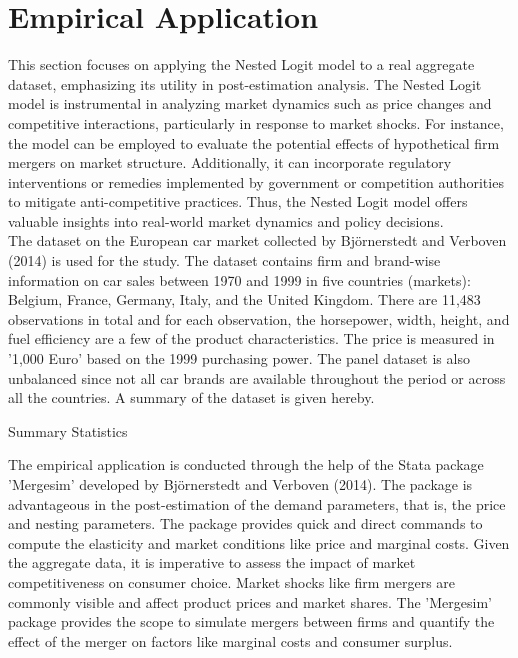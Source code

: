 \documentclass[a4paper,11pt]{article}
\begin{document}
\clearpage
\section{Empirical Application}
\label{sec:Empirical}

    This section focuses on applying the Nested Logit model to a real aggregate dataset, emphasizing its utility in post-estimation analysis. The Nested Logit model is instrumental in analyzing market dynamics such as price changes and competitive interactions, particularly in response to market shocks. For instance, the model can be employed to evaluate the potential effects of hypothetical firm mergers on market structure. Additionally, it can incorporate regulatory interventions or remedies implemented by government or competition authorities to mitigate anti-competitive practices. Thus, the Nested Logit model offers valuable insights into real-world market dynamics and policy decisions.\\

    The dataset on the European car market collected by Björnerstedt and Verboven (2014) \cite{bjornerstedt2014merger} is used for the study. The dataset contains firm and brand-wise information on car sales between 1970 and 1999 in five countries (markets): Belgium, France, Germany, Italy, and the United Kingdom. There are 11,483 observations in total and for each observation, the horsepower, width, height, and fuel efficiency are a few of the product characteristics. The price is measured in '1,000 Euro' based on the 1999 purchasing power. The panel dataset is also unbalanced since not all car brands are available throughout the period or across all the countries. A summary of the dataset is given hereby.\\

    \begin{table}[htbp]
        \caption{Summary Statistics} 
        \centering
        
        \label{tab: summ_table} 
    \end{table}

    The empirical application is conducted through the help of the Stata package 'Mergesim' developed by Björnerstedt and Verboven (2014). The package is advantageous in the post-estimation of the demand parameters, that is, the price and nesting parameters. The package provides quick and direct commands to compute the elasticity and market conditions like price and marginal costs. Given the aggregate data, it is imperative to assess the impact of market competitiveness on consumer choice. Market shocks like firm mergers are commonly visible and affect product prices and market shares. The 'Mergesim' package provides the scope to simulate mergers between firms and quantify the effect of the merger on factors like marginal costs and consumer surplus.\\   
    
\end{document}
